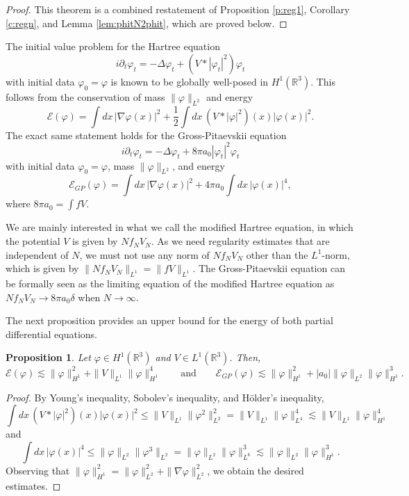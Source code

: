 \documentclass[11pt,a4paper,draft,DIV11]{scrartcl}	%
\newtheorem{prp}[thm]{Proposition}
\newcommand{\R}{\mathds{R}}
\newcommand{\norm}[1]{\lVert#1\rVert}	%
\begin{document}
\begin{proof}
  This theorem is a combined restatement of Proposition \ref{p:reg1},
  Corollary \ref{c:regn}, and Lemma \ref{lem:phitN2phit}, which are proved
  below.
\end{proof}


The initial value problem for the Hartree equation
\[
  i \partial_t \varphi_t = - \Delta \varphi_t + (V * |\varphi_t|^2)
  \varphi_t
\]
with initial data $\varphi_0 = \varphi$ is known to be globally well-posed
in $H^1(\R^3)$. This follows from the conservation of mass $\| \varphi
\|_{L^2}$ and energy
\[
  \mathcal{E}(\varphi) = \int dx \, |\nabla \varphi(x)|^2 + \frac{1}{2} \int
  dx \, (V * |\varphi|^2)(x) |\varphi(x)|^2.
\]
The exact same statement holds for the Gross-Pitaevskii equation
\[
  i \partial_t \varphi_t = - \Delta \varphi_t + 8 \pi a_0 |\varphi_t|^2
  \varphi_t
\]
with initial data $\varphi_0 = \varphi$, mass $\| \varphi \|_{L^2}$, and
energy
\[
  \mathcal{E}_{GP}(\varphi) = \int dx \, |\nabla \varphi(x)|^2 + 4 \pi a_0
  \int dx \, |\varphi(x)|^4,
\]
where $8 \pi a_0 = \int f V$.


We are mainly interested in what we call the modified Hartree equation, in
which the potential $V$ is given by $N f_N V_N$. As we need regularity
estimates that are independent of $N$, we must not use any norm of
$N f_N V_N$ other than
the $L^1$-norm, which is given by $\norm{N f_N V_N}_{L^1} = \| fV \|_{L^1}$.
The Gross-Pitaevskii equation can be formally seen as the limiting equation of the modified Hartree
equation as $N f_N V_N \to 8 \pi a_0 \delta$ when $N \to \infty$.


The next proposition provides an upper bound for the energy of both partial
differential equations.


\begin{prp} \label{p:energy}
  Let $\varphi \in H^1(\R^3)$ and $V \in L^1(\R^3)$. Then,
  \[
    \mathcal{E}(\varphi) \apprle \| \varphi \|_{H^1}^2 + \| V \|_{L^1} \|
    \varphi \|_{H^1}^4 \qquad \text{and} \qquad \mathcal{E}_{GP}(\varphi)
    \apprle \| \varphi \|_{H^1}^2 + |a_0| \| \varphi \|_{L^2} \| \varphi
    \|_{H^1}^3.
  \]
\end{prp}


\begin{proof}
  By Young's inequality, Sobolev's inequality, and H\"older's inequality, 
  \[
    \int dx \, (V * |\varphi|^2)(x) |\varphi(x)|^2 \le \| V \|_{L^1} \|
    \varphi^2 \|_{L^2}^2 = \| V \|_{L^1} \| \varphi \|_{L^4}^4 \apprle \| V
    \|_{L^1} \| \varphi \|_{H^1}^4
  \]
  and
  \[
    \int dx \, |\varphi(x)|^4 \le \| \varphi \|_{L^2} \| \varphi^3 \|_{L^2} =
    \| \varphi \|_{L^2} \| \varphi \|_{L^6}^3 \apprle \| \varphi \|_{L^2} \|
    \varphi \|_{H^1}^3.
  \]
  Observing that $\| \varphi \|_{H^1}^2 = \| \varphi \|_{L^2}^2 + \| \nabla
  \varphi \|_{L^2}^2$, we obtain the desired estimates.
\end{proof}
\end{document}
